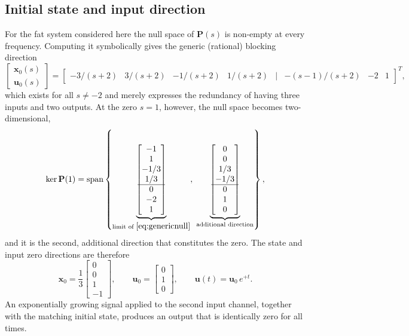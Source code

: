 \subsection{Initial state and input direction}
\label{sec:directions212}

For the fat system considered here the null space of $\mathbf{P}(s)$ is non-empty at every
frequency. Computing it symbolically gives the generic (rational) blocking direction
\begin{equation}
    \begin{bmatrix}\mathbf{x}_0(s)\\ \mathbf{u}_0(s)\end{bmatrix}
    = \begin{bmatrix}
        -3/(s+2) & 3/(s+2) & -1/(s+2) & 1/(s+2) &
        \big|\!\!\!\!& -(s-1)/(s+2) & -2 & 1
      \end{bmatrix}^T ,
    \label{eq:genericnull}
\end{equation}
which exists for all $s\neq -2$ and merely expresses the redundancy of having three inputs and
two outputs. At the zero $s=1$, however, the null space becomes two-dimensional,
\begin{equation}
    \ker\mathbf{P}(1) = \operatorname{span}\left\{
    \underbrace{\begin{bmatrix}-1\\1\\-1/3\\1/3\\ \hline 0\\-2\\1\end{bmatrix}}_{
        \text{limit of }\eqref{eq:genericnull}},\;
    \underbrace{\begin{bmatrix}0\\0\\1/3\\-1/3\\ \hline 0\\1\\0\end{bmatrix}}_{
        \text{additional direction}}\right\},
    \label{eq:null212}
\end{equation}
and it is the second, additional direction that constitutes the zero. The state and input zero
directions are therefore
\begin{equation}
    \mathbf{x}_0 = \frac{1}{3}\begin{bmatrix}0\\0\\1\\-1\end{bmatrix},
    \qquad
    \mathbf{u}_0 = \begin{bmatrix}0\\1\\0\end{bmatrix},
    \qquad
    \mathbf{u}(t) = \mathbf{u}_0\,e^{+t} .
    \label{eq:dir212}
\end{equation}
An exponentially growing signal applied to the second input channel, together with the matching
initial state, produces an output that is identically zero for all times.

